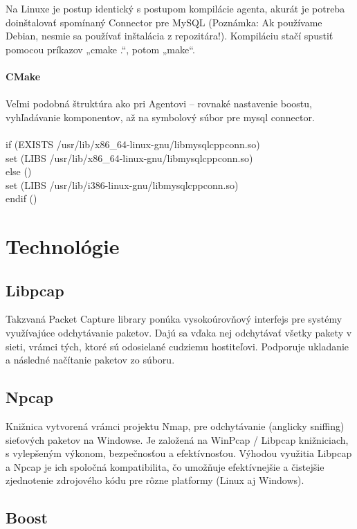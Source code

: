 \documentclass[a4paper,12pt]{article}
\begin{document}
Na Linuxe je postup identický s postupom kompilácie agenta, akurát je potreba doinštalovať spomínaný Connector pre MySQL (Poznámka: Ak používame Debian, nesmie sa používať inštalácia z repozitára!). Kompiláciu stačí spustiť pomocou príkazov „cmake .“, potom „make“. \\ \\
\textbf{CMake} \\ \\
Veľmi podobná štruktúra ako pri Agentovi – rovnaké nastavenie boostu, vyhľadávanie komponentov, až na symbolový súbor pre mysql connector.\\ \\
if (EXISTS /usr/lib/x86\_64-linux-gnu/libmysqlcppconn.so) \\
set (LIBS /usr/lib/x86\_64-linux-gnu/libmysqlcppconn.so) \\
else () \\
set (LIBS /usr/lib/i386-linux-gnu/libmysqlcppconn.so) \\
endif () \\


\section{Technológie}

\subsection{Libpcap}

Takzvaná Packet Capture library ponúka vysokoúrovňový interfejs pre systémy využívajúce odchytávanie paketov. Dajú sa vďaka nej odchytávať všetky pakety v sieti, vrámci tých, ktoré sú odosielané cudziemu hostiteľovi. Podporuje ukladanie a následné načítanie paketov zo súboru.

\subsection{Npcap}

Knižnica vytvorená vrámci projektu Nmap, pre odchytávanie (anglicky sniffing) sieťových paketov na Windowse. Je založená na WinPcap / Libpcap knižniciach, s vylepšeným výkonom, bezpečnosťou a efektívnosťou. Výhodou využitia Libpcap a Npcap je ich spoločná kompatibilita, čo umožňuje efektívnejšie a čistejšie zjednotenie zdrojového kódu pre rôzne platformy (Linux aj Windows).

\subsection{Boost}
\end{document}
